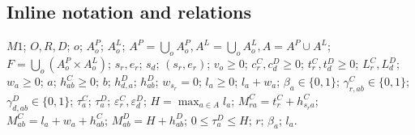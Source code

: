 \documentclass[10pt]{article}
\begin{document}
\subsection*{Inline notation and relations}
$M1$; $O,R,D$; $o$; $A_o^P$; $A_o^L$; $A^P=\bigcup_oA_o^P,A^L=\bigcup_oA_o^L,A=A^P\cup A^L$; $F=\bigcup_o(A_o^P\times A_o^L)$; $s_r,e_r$; $s_d$; $(s_r,e_r)$; $v_o\geq0$; $c_r^C,c_d^D\geq0$; $t_r^C,t_d^D\geq0$; $L_r^C,L_d^D$; $w_a\geq0$; $a$; $h_{ab}^C\geq0$; $b$; $h_{d,a}^D$; $h_{ab}^D$; $w_{s_r}=0$; $l_a\geq0$; $l_a+w_a$; $\beta_a\in\{0,1\}$; $\gamma^C_{r,ab}\in\{0,1\}$; $\gamma^D_{d,ab}\in\{0,1\}$; $\tau_a^C$; $\tau_a^D$; $\varepsilon_r^C,\varepsilon_d^D$; $H=\max_{a\in A}l_a$; $M_{ra}^C=t_r^C+h_{s_ra}^C$; $M_{ab}^C=l_a+w_a+h_{ab}^C$; $M_{ab}^D=H+h_{ab}^D$; $0\leq\tau_a^D\leq H$; $r$; $\beta_a$; $l_a$.
\end{document}
